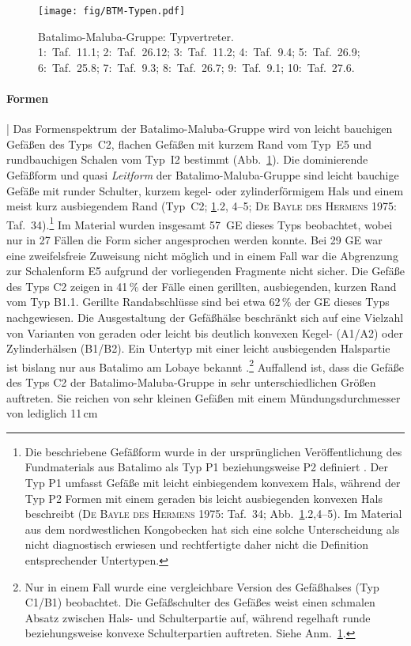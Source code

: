 \begin{figure}[!tb]
	\centering
	\texttt{[image: fig/BTM-Typen.pdf]}
	\caption{Batalimo-Maluba-Gruppe: Typvertreter.\\1:~Taf.~11.1; 2:~Taf.~26.12; 3:~Taf.~11.2; 4:~Taf.~9.4; 5:~Taf.~26.9; 6:~Taf.~25.8; 7:~Taf.~9.3; 8:~Taf.~26.7; 9:~Taf.~9.1; 10:~Taf.~27.6.}
	\label{Fig-BatMLB-Typvertreter}
\end{figure}

\paragraph{Formen}\hspace{-.5em}|\hspace{.5em}%
Das Formenspektrum der Batalimo-Maluba-Gruppe wird von leicht bauchigen Gefäßen des Typs~C2, flachen Gefäßen mit kurzem Rand vom Typ~E5 und rundbauchigen Schalen vom Typ~I2 bestimmt (Abb.~\ref{Fig-BatMLB-Typvertreter}). Die dominierende Gefäßform und quasi \textit{Leitform} der Batalimo-Maluba-Gruppe sind leicht bauchige Gefäße mit runder Schulter, kurzem kegel- oder zylinderförmigem Hals und einem meist kurz ausbiegendem Rand (Typ~C2; \ref{Fig-BatMLB-Typvertreter}.2, 4--5; \textsc{De Bayle des Hermens} 1975: Taf.~34).\footnote{Die beschriebene Gefäßform wurde in der ursprünglichen Veröffentlichung des Fundmaterials aus Batalimo als Typ P1 beziehungsweise P2 definiert \parencites[Taf.~33--34]{deBayledesHermens.1975}[Umzeichnung bei][135 Abb.~5.1]{Eggert.1987c}. Der Typ P1 umfasst Gefäße mit leicht einbiegendem konvexem Hals, während der Typ P2 Formen mit einem geraden bis leicht ausbiegenden konvexen Hals beschreibt (\textsc{De Bayle des Hermens} 1975: Taf.~34; Abb.~\ref{Fig-BatMLB-Typvertreter}.2,4--5). Im Material aus dem nordwestlichen Kongobecken hat sich eine solche Unterscheidung als nicht diagnostisch erwiesen und rechtfertigte daher nicht die Definition entsprechender Untertypen.\label{ftn:BatalimoGefTypen}} Im Material wurden insgesamt 57~GE dieses Typs beobachtet, wobei nur in 27 Fällen die Form sicher angesprochen werden konnte. Bei 29 GE war eine zweifelsfreie Zuweisung nicht möglich und in einem Fall war die Abgrenzung zur Schalenform E5 aufgrund der vorliegenden Fragmente nicht sicher. Die Gefäße des Typs C2 zeigen in 41\,\% der Fälle einen gerillten, ausbiegenden, kurzen Rand vom Typ B1.1. Gerillte Randabschlüsse sind bei etwa 62\,\% der GE dieses Typs nachgewiesen. Die Ausgestaltung der Gefäßhälse beschränkt sich auf eine Vielzahl von Varianten von geraden oder leicht bis deutlich konvexen Kegel- (A1/A2) oder Zylinderhälsen (B1/B2). Ein Untertyp mit einer leicht ausbiegenden Halspartie ist bislang nur aus Batalimo am Lobaye bekannt \parencite[Taf.~33]{deBayledesHermens.1975}.\footnote{Nur in einem Fall wurde eine vergleichbare Version des Gefäßhalses (Typ C1/B1) beobachtet. Die Gefäßschulter des Gefäßes weist einen schmalen Absatz zwischen Hals- und Schulterpartie auf, während regelhaft runde beziehungsweise konvexe Schulterpartien auftreten. Siehe Anm.~\ref{ftn:BatalimoGefTypen}.} Auffallend ist, dass die Gefäße des Typs C2 der Batalimo-Maluba-Gruppe in sehr unterschiedlichen Größen auftreten. Sie reichen von sehr kleinen Gefäßen mit einem Mündungsdurchmesser von lediglich 11\,cm 